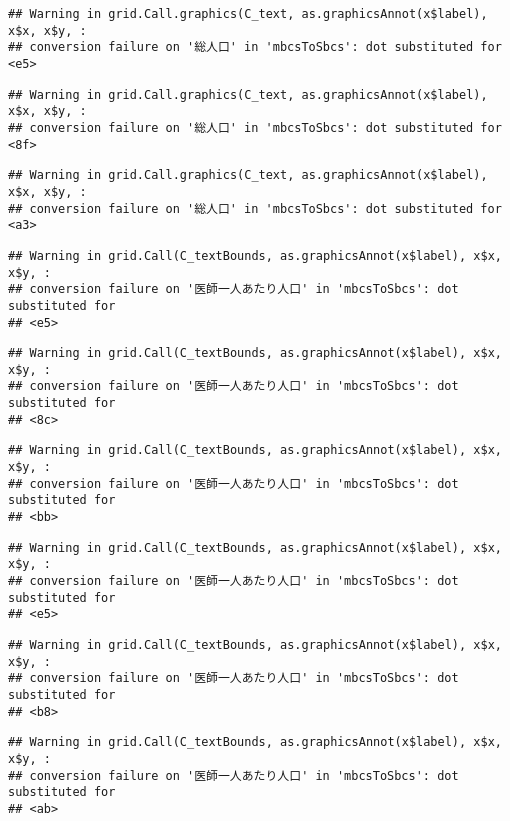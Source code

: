 \documentclass[
]{article}
\begin{document}
\begin{verbatim}
## Warning in grid.Call.graphics(C_text, as.graphicsAnnot(x$label), x$x, x$y, :
## conversion failure on '総人口' in 'mbcsToSbcs': dot substituted for <e5>
\end{verbatim}

\begin{verbatim}
## Warning in grid.Call.graphics(C_text, as.graphicsAnnot(x$label), x$x, x$y, :
## conversion failure on '総人口' in 'mbcsToSbcs': dot substituted for <8f>
\end{verbatim}

\begin{verbatim}
## Warning in grid.Call.graphics(C_text, as.graphicsAnnot(x$label), x$x, x$y, :
## conversion failure on '総人口' in 'mbcsToSbcs': dot substituted for <a3>
\end{verbatim}

\begin{verbatim}
## Warning in grid.Call(C_textBounds, as.graphicsAnnot(x$label), x$x, x$y, :
## conversion failure on '医師一人あたり人口' in 'mbcsToSbcs': dot substituted for
## <e5>
\end{verbatim}

\begin{verbatim}
## Warning in grid.Call(C_textBounds, as.graphicsAnnot(x$label), x$x, x$y, :
## conversion failure on '医師一人あたり人口' in 'mbcsToSbcs': dot substituted for
## <8c>
\end{verbatim}

\begin{verbatim}
## Warning in grid.Call(C_textBounds, as.graphicsAnnot(x$label), x$x, x$y, :
## conversion failure on '医師一人あたり人口' in 'mbcsToSbcs': dot substituted for
## <bb>
\end{verbatim}

\begin{verbatim}
## Warning in grid.Call(C_textBounds, as.graphicsAnnot(x$label), x$x, x$y, :
## conversion failure on '医師一人あたり人口' in 'mbcsToSbcs': dot substituted for
## <e5>
\end{verbatim}

\begin{verbatim}
## Warning in grid.Call(C_textBounds, as.graphicsAnnot(x$label), x$x, x$y, :
## conversion failure on '医師一人あたり人口' in 'mbcsToSbcs': dot substituted for
## <b8>
\end{verbatim}

\begin{verbatim}
## Warning in grid.Call(C_textBounds, as.graphicsAnnot(x$label), x$x, x$y, :
## conversion failure on '医師一人あたり人口' in 'mbcsToSbcs': dot substituted for
## <ab>
\end{verbatim}
\end{document}
